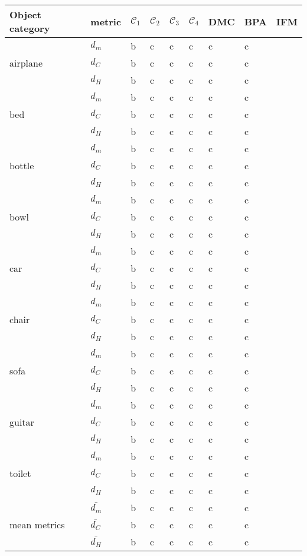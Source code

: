 \begin{center}
     \label{tab:distance7500} 
    \begin{tabular}{| l | p{1.1cm} | p{0.8cm} | p{0.8cm} | p{0.8cm} | p{0.8cm} | p{0.9cm} | p{0.9cm} | p{0.9cm} |}
        \hline
        Object category& metric& $\mathcal{C}_1$ & $\mathcal{C}_2$ & $\mathcal{C}_3$ & $\mathcal{C}_4$ & DMC & BPA & IFM \\ \hline
        \multirow{3}{*}{airplane}&$d_m$&b&c&c&c&c&c&\\
        &$d_C$&b&c&c&c&c&c&\\
        &$d_H$&b&c&c&c&c&c&\\
        \hline
        \multirow{3}{*}{bed}&$d_m$&b&c&c&c&c&c&\\
        &$d_C$&b&c&c&c&c&c&\\
        &$d_H$&b&c&c&c&c&c&\\
        \hline
        \multirow{3}{*}{bottle}&$d_m$&b&c&c&c&c&c&\\
        &$d_C$&b&c&c&c&c&c&\\
        &$d_H$&b&c&c&c&c&c&\\
        \hline
        \multirow{3}{*}{bowl}&$d_m$&b&c&c&c&c&c&\\
        &$d_C$&b&c&c&c&c&c&\\
        &$d_H$&b&c&c&c&c&c&\\
        \hline
        \multirow{3}{*}{car}&$d_m$&b&c&c&c&c&c&\\
        &$d_C$&b&c&c&c&c&c&\\
        &$d_H$&b&c&c&c&c&c&\\
        \hline
        \multirow{3}{*}{chair}&$d_m$&b&c&c&c&c&c&\\
        &$d_C$&b&c&c&c&c&c&\\
        &$d_H$&b&c&c&c&c&c&\\
        \hline
        \multirow{3}{*}{sofa}&$d_m$&b&c&c&c&c&c&\\
        &$d_C$&b&c&c&c&c&c&\\
        &$d_H$&b&c&c&c&c&c&\\
        \hline
         \multirow{3}{*}{guitar}&$d_m$&b&c&c&c&c&c&\\
         &$d_C$&b&c&c&c&c&c&\\
         &$d_H$&b&c&c&c&c&c&\\
         \hline
        \multirow{3}{*}{toilet}&$d_m$&b&c&c&c&c&c&\\
        &$d_C$&b&c&c&c&c&c&\\
        &$d_H$&b&c&c&c&c&c&\\
        \hline\hline
        \multirow{3}{*}{mean metrics}&$\bar{d_m}$&b&c&c&c&c&c&\\
        &$\bar{d_C}$&b&c&c&c&c&c&\\
        &$\bar{d_H}$&b&c&c&c&c&c&\\
        \hline
    \end{tabular}
\end{center}



